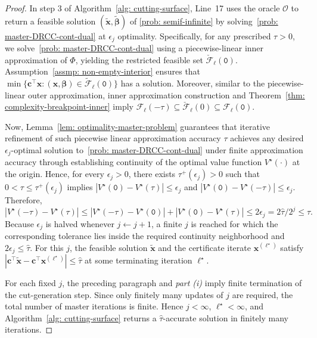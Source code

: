 \documentclass[opre,sglanonrev]{informs4}
\newcommand{\mF}{\mathcal{F}}
\newcommand{\bbeta}{\bm{\beta}}
\newcommand{\bc}{\bm{c}}
\newcommand{\bx}{\bm{x}}
\begin{document}
{\begin{proof}
In step 3 of Algorithm~\ref{alg: cutting-surface}, Line~17 uses the oracle $\mathcal{O}$
to return a feasible solution \((\tilde{\bx},\tilde{\bbeta})\) of
\eqref{prob: semif-infinite} by solving~\eqref{prob: master-DRCC-cont-dual} at $\epsilon_j$ optimality. Specifically, for any prescribed \(\tau>0\), we solve~\eqref{prob: master-DRCC-cont-dual}
using a piecewise-linear inner approximation of \(\Phi\), yielding the restricted
feasible set \(\check{\mF}_{\ell}(\mathtt{0})\). Assumption~\ref{assmp: non-empty-interior} ensures that \(\min\{\bc^\top\bx:(\bx,\bbeta)\in\widetilde{\mF}_\ell(\mathtt{0})\}\) has a solution.  Moreover, similar to the piecewise-linear outer
approximation, inner approximation construction and
Theorem~\ref{thm: complexity-breakpoint-inner} imply \(\mF_\ell(-\tau) \subseteq \check{\mF}_\ell(0) \subseteq\mF_\ell(\mathtt{0})\).

Now, Lemma~\ref{lem: optimality-master-problem} guarantees that iterative refinement of such piecewise linear approximation accuracy $\tau$ achieves any desired $\epsilon_j$-optimal solution to~\eqref{prob: master-DRCC-cont-dual} under finite approximation accuracy through establishing continuity of
the optimal value function \(V^\star(\cdot)\) at the origin.
Hence, for every \(\epsilon_j>0\), there exists \(\tau^+(\epsilon_j)>0\) such
that \(0<\tau\le\tau^+(\epsilon_j)\) implies
\(|V^\star(\mathtt{0})-V^\star(\tau)|\le\epsilon_j\) and
\(|V^\star(\mathtt{0})-V^\star(-\tau)|\le\epsilon_j\). Therefore,
\[
|V^\star(-\tau)-V^\star(\tau)|
\le
|V^\star(-\tau)-V^\star(\mathtt{0})|
+
|V^\star(\mathtt{0})-V^\star(\tau)|
\le
2\epsilon_j
=
2\hat{\tau}/2^j \leq \hat{\tau} .
\]
Because \(\epsilon_j\) is halved whenever \(j\gets j+1\), a finite \(j\) is
reached for which the corresponding tolerance lies inside the required
continuity neighborhood and \(2\epsilon_j\le\hat{\tau}\). For this \(j\), the
feasible solution \(\tilde{\bx}\) and the certificate iterate
\(\bx^{(\ell^\star)}\) satisfy
\(|\bc^\top\tilde{\bx}-\bc^\top\bx^{(\ell^\star)}|\le\hat{\tau}\) at some terminating iteration $\ell^\star$.

For each fixed \(j\), the preceding paragraph and \emph{part (i)} imply finite
termination of the cut-generation step. Since only finitely many updates of
\(j\) are required, the total number of master iterations is finite. Hence
\(j<\infty\), \(\ell^\star<\infty\), and
Algorithm~\ref{alg: cutting-surface} returns a \(\hat{\tau}\)-accurate solution in finitely many iterations.
\end{proof}
}
\end{document}
